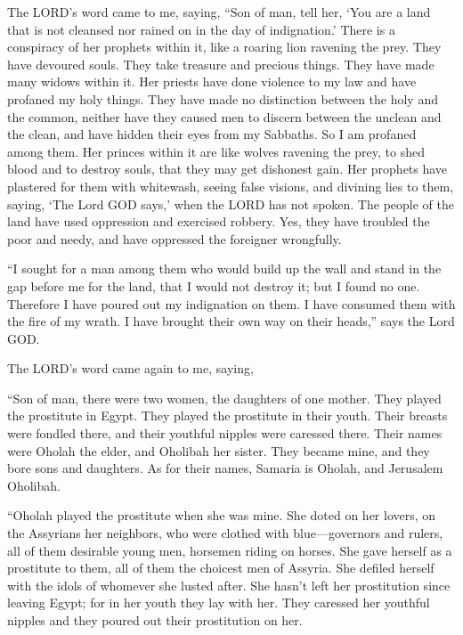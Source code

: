 \myverse{}The LORD’s word came to me, saying,
\myverse{}“Son of man, tell her, ‘You are a land that is not cleansed nor rained on
in the day of indignation.’
\myverse{}There is a conspiracy of her prophets within it, like a roaring lion ravening
the prey. They have devoured souls. They take treasure and precious things. They have made many widows
within it.
\myverse{}Her priests have done violence to my law and have profaned my holy things.
They have made no distinction between the holy and the common, neither have they caused men to discern
between the unclean and the clean, and have hidden their eyes from my Sabbaths. So I am profaned among
them.
\myverse{}Her princes within it are like wolves ravening the prey, to shed blood and
to destroy souls, that they may get dishonest gain.
\myverse{}Her prophets have plastered for them with whitewash, seeing false visions,
and divining lies to them, saying, ‘The Lord GOD says,’ when the LORD has not spoken.
\myverse{}The people of the land have used oppression and exercised robbery. Yes, they
have troubled the poor and needy, and have oppressed the foreigner wrongfully.


\myverse{}“I sought for a man among them who would build up the wall and
stand in the gap before me for the land, that I would not destroy it; but I found no one.
\myverse{}Therefore I have poured out my indignation on them. I have consumed them
with the fire of my wrath. I have brought their own way on their heads,” says the Lord GOD.

\mychapter{} \myverse*{}The LORD’s word came again to me, saying,

\quad\quad \myverse{}“Son of man, there were two women, the daughters of one mother.
\myverse{}They played the prostitute in Egypt. They played the prostitute in their youth.
Their breasts were fondled there, and their youthful nipples were caressed there.
\myverse{}Their names were Oholah the elder, and Oholibah her sister. They became mine,
and they bore sons and daughters. As for their names, Samaria is Oholah, and Jerusalem Oholibah.

\myverse{}“Oholah played the prostitute when she was mine. She doted on
her lovers, on the Assyrians her neighbors,
\myverse{}who were clothed with blue—governors and rulers, all of them desirable young
men, horsemen riding on horses.
\myverse{}She gave herself as a prostitute to them, all of them the choicest men of Assyria.
She defiled herself with the idols of whomever she lusted after.
\myverse{}She hasn’t left her prostitution since leaving Egypt; for in her youth they
lay with her. They caressed her youthful nipples and they poured out their prostitution on her.

